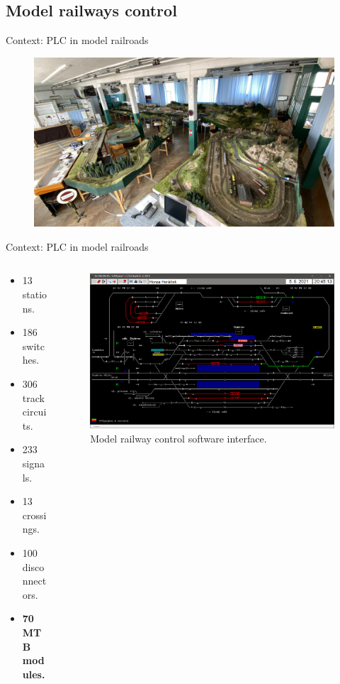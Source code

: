 \documentclass[aspectratio=169]{beamer}
\begin{document}
\subsection{Model railways control}

\begin{frame}{Context: PLC in model railroads}
\begin{figure}
\includegraphics[width=0.8\columnwidth]{data/kolejisteMosilana.jpg}
\end{figure}
\end{frame}


\begin{frame}{Context: PLC in model railroads}
\begin{columns}
	\begin{column}{.3\textwidth}
		\begin{itemize}
		\item 13 stations.
		\item 186 switches.
		\item 306 track circuits.
		\item 233 signals.
		\item 13 crossings.
		\item 100 disconnectors.
		\item \textbf{70 MTB modules.}
		\end{itemize}
	\end{column}
	\begin{column}{.65\textwidth}
		\begin{figure}
		\includegraphics[width=\columnwidth]{data/sk.png}
		\caption{Model railway control software interface.}
		\end{figure}
	\end{column}
\end{columns}
\end{frame}
\end{document}
